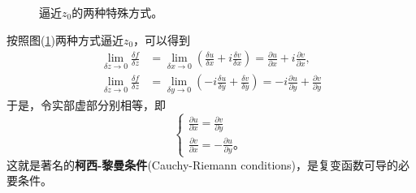 \begin{figure}
    \centering
    
    \caption{逼近$z_0$的两种特殊方式。}
    \label{fig:limits}
\end{figure}
按照图(\ref{fig:limits})两种方式逼近$z_0$，可以得到
\begin{align}
    \lim _{\delta z \rightarrow 0} \frac{\delta f}{\delta z} &=\lim _{\delta x \rightarrow 0}\left(\frac{\delta u}{\delta x}+i \frac{\delta v}{\delta x}\right)=\frac{\partial u}{\partial x}+i \frac{\partial v}{\partial x},
\\
    \lim _{\delta z \rightarrow 0} \frac{\delta f}{\delta z} &=\lim _{\delta y \rightarrow 0}\left(-i \frac{\delta u}{\delta y}+\frac{\delta v}{\delta y}\right)=-i \frac{\partial u}{\partial y}+\frac{\partial v}{\partial y}
\end{align}
于是，令实部虚部分别相等，即
\begin{equation}
    \begin{cases}
        \frac{\partial u}{\partial x}=\frac{\partial v}{\partial y} \\
        \frac{\partial v}{\partial x}=-\frac{\partial u}{\partial y} \textrm{。}
    \end{cases}
\end{equation}
这就是著名的{\bf 柯西-黎曼条件}(Cauchy-Riemann conditions)，是复变函数可导的必要条件。
